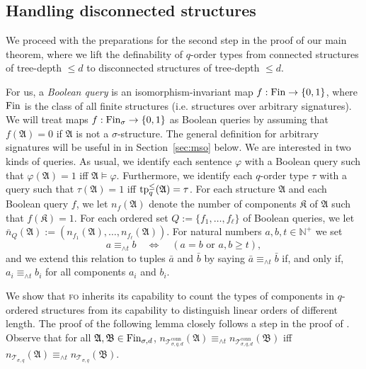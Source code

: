 \documentclass[11pt]{article}
\renewcommand{\phi}{\varphi}
\newcommand{\fin}{\textup{Fin}}
\newcommand{\conn}{\text{conn}}
\newcommand{\logic}[1]{\textsc{#1}}
\newcommand{\FO}{\logic{fo}}
\newcommand{\types}[1][\sigma,q,d]{\mathcal{T}_{#1}}
\newcommand{\ctypes}[1][\sigma,q,d]{\mathcal{T}^{\conn}_{#1}}
\newcommand{\maxeq}[1]{\equiv_{{\wedge}#1}}
\newcommand{\leqsym}{\logic{\ensuremath{\leq}}}
\DeclareMathOperator{\tp}{tp}
\newcommand{\struct}[1]{\mathfrak{#1}}
\newcommand{\AS}{\struct{A}}
\newcommand{\BS}{\struct{B}}
\newcommand{\KS}{\struct{K}}
\newcommand{\set}[1]{\{#1\}}
\newcommand{\Npos}{\mathbb{N}^{+}}
\begin{document}
\subsection{Handling disconnected structures}

We proceed with the preparations for the second step in the proof of
our main theorem, where we lift the definability of $q$-order types
from connected structures of tree-depth $\leq d$ to disconnected
structures of tree-depth $\leq d$.

For us, a \emph{Boolean query} is an isomorphism-invariant map $f : \fin \to
\set{0,1}$, where $\fin$ is the class of all finite structures (i.e. structures
over arbitrary signatures). We will treat maps $f : \fin_\sigma \to \set{0,1}$
as Boolean queries by assuming that $f(\AS)=0$ if $\AS$ is not a
$\sigma$-structure. The general definition for arbitrary signatures will be
useful in in Section~\ref{sec:mso} below.  We are interested in two kinds of
queries.  As usual, we identify each sentence $\phi$ with a Boolean query such
that $\phi(\AS)=1$ iff $\AS\models\phi$.  Furthermore, we identify each
$q$-order type $\tau$ with a query such that $\tau(\AS)=1$ iff
$\tp^\leqsym_q(\AS)=\tau$. For each structure $\AS$ and each Boolean query $f$,
we let $n_f(\AS)$ denote the number of components $\KS$ of $\AS$ such that
$f(\KS)=1$.  For each ordered set $Q := \set{f_1, \ldots, f_\ell}$ of Boolean
queries, we let $\bar n_Q(\AS):=(n_{f_1}(\AS), \ldots, n_{f_\ell}(\AS))$.  For
natural numbers $a, b, t \in \Npos$ we set
\[
a \maxeq{t} b\quad
\Leftrightarrow
\quad
(a = b \text{ or }a,b \geq t),
\]
and we extend this relation to tuples $\bar a$ and $\bar b$ by saying
$\bar a \maxeq{t} \bar b$ if, and only if, $a_i \maxeq{t} b_i$ for
all components $a_i$ and $b_i$.

We show that \FO{} inherits its capability to count the types of
components in $q$-ordered structures from its capability to
distinguish linear orders of different length.  The proof of the
following lemma closely follows a step in the proof of
\cite[Thm. 5.5]{BenediktSegoufin2009}.
Observe that for all $\AS, \BS \in \fin_{\sigma,d}$, 
$n_{\ctypes[\sigma,q,d]}(\AS) \maxeq{t} n_{\ctypes[\sigma,q,d]}(\BS)$ iff 
$n_{\types[\sigma,q]}(\AS) \maxeq{t} n_{\types[\sigma,q]}(\BS)$. 
\end{document}
